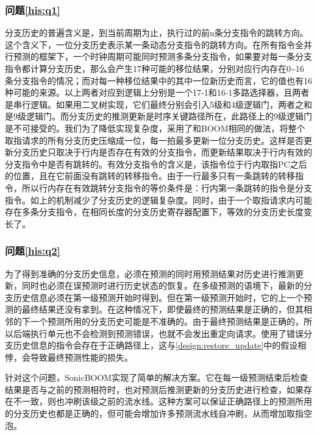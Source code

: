 \subsubsection*{问题\ref{his:q1}}
分支历史的普遍含义是，到当前周期为止，执行过的前n条分支指令的跳转方向。这个含义下，一位分支历史表示某一条动态分支指令的跳转方向。在所有指令全并行预测的框架下，一个时钟周期可能同时预测多条分支指令，如果要对每一条分支指令都计算分支历史，那么会产生17种可能的移位结果，分别对应行内存在0\textasciitilde16条分支指令的情况；而对每一种移位结果中的其中一位新历史而言，它的值也有16种可能的来源。以上两者对应到逻辑上分别是一个17-1和16-1多路选择器，且两者是串行逻辑。如果用二叉树实现，它们最终分别会引入5级和4级逻辑门，两者之和是9级逻辑门。而分支历史的推测更新是时序关键路径所在，此路径上的9级逻辑门是不可接受的。我们为了降低实现复杂度，采用了和BOOM相同的做法，将整个取指请求的所有分支历史压缩成一位，每一拍最多更新一位分支历史。这样是否更新分支历史只取决于行内是否存在有效的分支指令，而更新结果取决于行内有效的分支指令中是否有跳转的。有效分支指令的含义是，该指令位于行内取指PC之后的位置，且在它前面没有跳转的转移指令。由于一行最多只有一条跳转的转移指令，所以行内存在有效跳转分支指令的等价条件是：行内第一条跳转的指令是分支指令。如上的机制减少了分支历史的逻辑复杂度。同时，由于一个取指请求内可能存在多条分支指令，在相同长度的分支历史寄存器配置下，等效的分支历史长度变长了。

\subsubsection*{问题\ref{his:q2}}
为了得到准确的分支历史信息，必须在预测的同时用预测结果对历史进行推测更新，同时也必须在误预测时进行历史状态的恢复。在多级预测的语境下，最新的分支历史信息必须在第一级预测开始时得到。但在第一级预测开始时，它的上一个预测的最终结果还没有拿到。在这种情况下，即使最终的预测结果是正确的，但其相邻的下一个预测所用的分支历史可能是不准确的。由于最终预测结果是正确的，所以后端执行单元也不会检测到预测错误，也就不会发出重定向请求。使用了错误分支历史信息的指令会存在于正确路径上，这与\ref{design:restore_update}中的假设相悖，会导致最终预测性能的损失。

针对这个问题，SonicBOOM\cite{zhao2020sonicboom}实现了简单的解决方案。它在每一级预测结束后检查结果是否与之前的预测相符时，也对预测后推测更新的分支历史进行检查，如果存在不一致，则也冲刷该级之前的流水线。这种方案可以保证正确路径上的预测所用的分支历史也都是正确的，但可能会增加许多预测流水线自冲刷，从而增加取指空泡。

